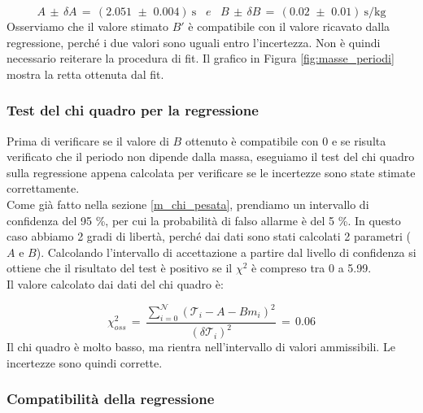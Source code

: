 	\begin{equation*}
		A \,\pm\, \delta A \,=\, (2.051 \,\, \pm \,\, 0.004) \: \si{\second} \,\,\,\,\, e \,\,\,\,\,
		B \,\pm\, \delta B \,=\, (0.02 \,\, \pm \,\, 0.01) \: \si{\second\per\kilo\gram}
	\end{equation*}
    Osserviamo che il valore stimato $B'$ è compatibile con il valore ricavato dalla regressione, perché i due valori
    sono uguali entro l'incertezza. Non è quindi necessario reiterare la procedura di fit.
    Il grafico in Figura \ref{fig:masse_periodi} mostra la retta ottenuta dal fit.

\subsubsection{Test del chi quadro per la regressione}

Prima di verificare se il valore di $B$ ottenuto è compatibile con 0 e se risulta verificato che il periodo non dipende dalla massa,
eseguiamo il test del chi quadro sulla regressione appena calcolata per verificare se le incertezze sono state stimate correttamente.\\
%
Come già fatto nella sezione \ref{m_chi_pesata}, prendiamo un intervallo di confidenza del 95 \%, per cui la probabilità di falso allarme
è del 5 \%. In questo caso abbiamo 2 gradi di libertà, perché dai dati sono stati calcolati 2 parametri ($A$ e $B$). Calcolando l'intervallo
di accettazione a partire dal livello di confidenza si ottiene che il risultato del test è positivo se il $\chi^2$ è compreso tra 0 a 5.99. \\
%
Il valore calcolato dai dati del chi quadro è:

\begin{equation*}
	\chi_{oss}^2 \,=\, \frac{\sum_{i=0}^{\mathcal{N}} (\mathcal{T}_i - A - Bm_i)^2}{(\delta \mathcal{T}_i)^2} \,=\, 0.06
\end{equation*}
%
Il chi quadro è molto basso, ma rientra nell'intervallo di valori ammissibili. Le incertezze sono quindi corrette.

\subsubsection{Compatibilità della regressione}


